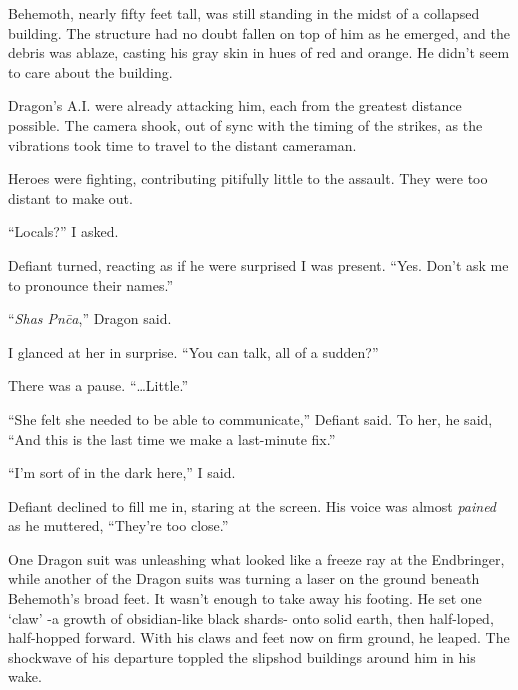 Behemoth, nearly fifty feet tall, was still standing in the midst of a collapsed building.  The structure had no doubt fallen on top of him as he emerged, and the debris was ablaze, casting his gray skin in hues of red and orange.  He didn't seem to care about the building.



Dragon's A.I. were already attacking him, each from the greatest distance possible.  The camera shook, out of sync with the timing of the strikes, as the vibrations took time to travel to the distant cameraman.



Heroes were fighting, contributing pitifully little to the assault.  They were too distant to make out.



``Locals?'' I asked.



Defiant turned, reacting as if he were surprised I was present.  ``Yes.  Don't ask me to pronounce their names.''



``\emph{Shas Pn\=ca},'' Dragon said.



I glanced at her in surprise.  ``You can talk, all of a sudden?''



There was a pause.  ``\ldots{}Little.''



``She felt she needed to be able to communicate,'' Defiant said.  To her, he said, ``And this is the last time we make a last-minute fix.''



``I'm sort of in the dark here,'' I said.



Defiant declined to fill me in, staring at the screen.  His voice was almost \emph{pained} as he muttered, ``They're too close.''



One Dragon suit was unleashing what looked like a freeze ray at the Endbringer, while another of the Dragon suits was turning a laser on the ground beneath Behemoth's broad feet.  It wasn't enough to take away his footing.  He set one `claw' -a growth of obsidian-like black shards- onto solid earth, then half-loped, half-hopped forward.  With his claws and feet now on firm ground, he leaped.  The shockwave of his departure toppled the slipshod buildings around him in his wake.



